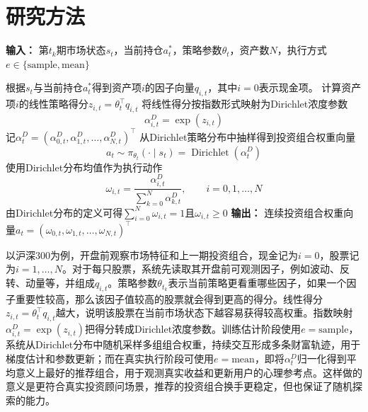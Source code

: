 \documentclass{sufethesismas}
\begin{document}
\section{研究方法}
\begin{algorithm}[H]
\caption{Dirichlet策略函数抽取投资组合}
\label{alg:dirichlet_policy_ch2}
\begin{algorithmic}[1]
\STATE \textbf{输入：} 第$t_k$期市场状态$s_t$，当前持仓$a_{t}^*$，策略参数$\theta_t$，资产数$N$，执行方式$e\in\{\mathrm{sample},\mathrm{mean}\}$

    \STATE 根据$s_t$与当前持仓$a_t^*$得到资产项$i$的因子向量$q_{i,t}$，其中$i=0$表示现金项。
    \STATE 计算资产项$i$的线性策略得分$z_{i,t}=\theta_t^\top q_{i,t}$
    \STATE 将线性得分按指数形式映射为Dirichlet浓度参数
    \begin{equation*}
    \alpha^D_{i,t}
    =
    \exp(z_{i,t})
    \end{equation*}
\ENDFOR
\STATE 记$\alpha^D_t=(\alpha^D_{0,t},\alpha^D_{1,t},\dots,\alpha^D_{N,t})^\top$
    \STATE 从Dirichlet策略分布中抽样得到投资组合权重向量
\begin{equation*}
a_t
\sim
\pi_{\theta_t}(\cdot\mid s_t)
=
\operatorname{Dirichlet}(\alpha^D_t)
\end{equation*}
\ELSE
    \STATE 使用Dirichlet分布均值作为执行动作
\begin{equation*}
\omega_{i,t}
=
\frac{\alpha^D_{i,t}}{\sum_{k=0}^{N}\alpha^D_{k,t}},
\qquad
i=0,1,\dots,N
\end{equation*}
\ENDIF
\STATE 由Dirichlet分布的定义可得$\sum_{i=0}^{N}\omega_{i,t}=1$且$\omega_{i,t}\ge 0$
\STATE \textbf{输出：} 连续投资组合权重向量$a_t=(\omega_{0,t},\omega_{1,t},\dots,\omega_{N,t})^\top$
\end{algorithmic}
\end{algorithm}

以沪深300为例，开盘前观察市场特征和上一期投资组合，现金记为$i=0$，股票记为$i=1,\dots,N$。对于每只股票，系统先读取其开盘前可观测因子，例如波动、反转、动量等，并组成$q_{i,t}$。策略参数$\theta_{t_k}$表示当前策略更看重哪些因子，如果一个因子重要性较高，那么该因子值较高的股票就会得到更高的得分。线性得分$z_{i,t}=\theta_t^\top q_{i,t}$越大，说明该股票在当前市场状态下越容易获得较高权重。指数映射$\alpha^D_{i,t}=\exp(z_{i,t})$把得分转成Dirichlet浓度参数。训练估计阶段使用$e=\mathrm{sample}$，系统从Dirichlet分布中随机采样多组组合权重，持续交互形成多条财富轨迹，用于梯度估计和参数更新；而在真实执行阶段可使用$e=\mathrm{mean}$，即将$\alpha^D_t$归一化得到平均意义上最好的推荐组合，用于观测真实收益和更新用户的心理参考点。这样做的意义是更符合真实投资顾问场景，推荐的投资组合换手更稳定，但也保证了随机探索的能力。
\end{document}
